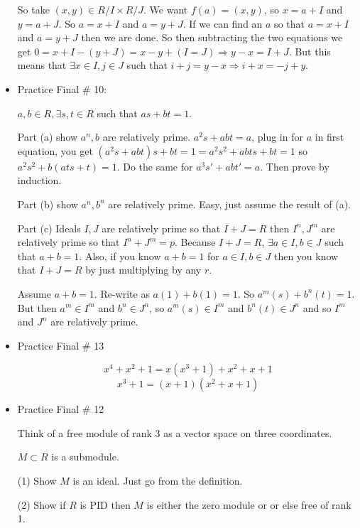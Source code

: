 \documentclass[12pt]{article}
\begin{document}
\begin{itemize}
        So take $(x,y) \in R/I \times R/J$. We want $f(a) = (x, y)$, so $x =
        a+I$ and $y = a + J$. So $a = x + I$ and $a = y + J$. If we can find an
        $a$ so that $a = x + I$ and $a = y + J$ then we are done.  So then
        subtracting the two equations we get $0 = x + I - (y + J) = x - y + (I
        = J) \Rightarrow y - x = I + J$. But this means that $\exists x \in I,
        j \in J$ such that $ i + j = y - x \Rightarrow i + x = -j + y$.

    \item 
        Practice Final \# 10: 

        $a, b \in R, \exists s, t \in R$ such that $as + bt = 1$.

        Part (a) show $a^n, b$ are relatively prime. $a^2s + abt = a$, plug in
        for $a$ in first equation, you get $(a^2s + abt)s + bt = 1 = a^2s^2 +
        abts + bt = 1$ so $a^2s^2 + b(ats + t) = 1$. Do the same for $a^3s' +
        abt' = a$. Then prove by induction.

        Part (b) show $a^n, b^n$ are relatively prime. Easy, just assume the
        result of (a). 

        Part (c) Ideals $I, J$ are relatively prime so that $I + J = R$ then
        $I^n, J^m$ are relatively prime so that $I^n + J^m = p$. Because $I + J
        = R$, $\exists a \in I, b \in J$ such that $a + b = 1$. Also, if you
        know $a + b = 1$ for $a \in I, b \in J$ then you know that $I + J = R$
        by just multiplying by any $r$.

        Assume $a + b = 1$. Re-write as $a(1) + b(1) = 1$. So $a^m(s) + b^n(t)
        = 1$. But then $a^m \in I^m$ and $b^n \in J^n$, so $a^m(s) \in I^m$ and
        $b^n(t) \in J^n$ and so $I^m$ and $J^n$ are relatively prime.

    \item 
        Practice Final \# 13

        $$x^4 + x^2 + 1 = x(x^3 + 1) + x^2 + x + 1$$
        $$x^3 + 1 = (x + 1)(x^2 + x + 1)$$

    \item
        Practice Final \# 12

        Think of a free module of rank 3 as a vector space on three coordinates.

        $M \subset R$ is a submodule. 

        (1) Show $M$ is an ideal. Just go from the definition.

        (2) Show if $R$ is PID then $M$ is either the zero module or or else
        free of rank 1.


\end{itemize}
\end{document}
